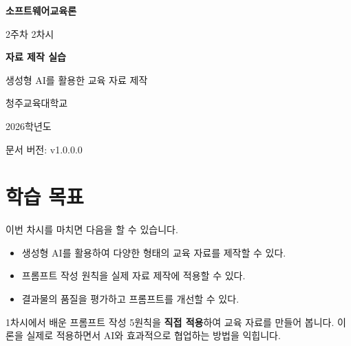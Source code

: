 \documentclass[11pt,a4paper]{article}
\begin{document}
\begin{titlepage}
\centering
\vspace*{3cm}

{\Huge\bfseries\color{mainblue} 소프트웨어교육론}

\vspace{1cm}

{\LARGE 2주차 2차시}

\vspace{0.5cm}

{\huge\bfseries 자료 제작 실습}

\vspace{2cm}

{\Large 생성형 AI를 활용한 교육 자료 제작}

\vspace{3cm}

{\large 청주교육대학교}

\vspace{0.5cm}

{\large 2026학년도}

\vfill

{\normalsize 문서 버전: v1.0.0.0}

\end{titlepage}

\tableofcontents
\newpage


\section{학습 목표}

이번 차시를 마치면 다음을 할 수 있습니다.

\begin{itemize}
  \item 생성형 AI를 활용하여 다양한 형태의 교육 자료를 제작할 수 있다.
  \item 프롬프트 작성 원칙을 실제 자료 제작에 적용할 수 있다.
  \item 결과물의 품질을 평가하고 프롬프트를 개선할 수 있다.
\end{itemize}

\begin{infobox}
1차시에서 배운 프롬프트 작성 5원칙을 \textbf{직접 적용}하여 교육 자료를 만들어 봅니다. 
이론을 실제로 적용하면서 AI와 효과적으로 협업하는 방법을 익힙니다.
\end{infobox}

\newpage
\end{document}
